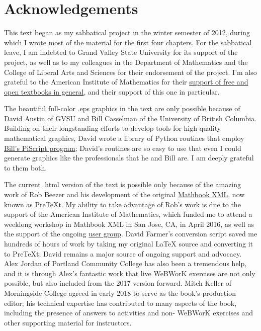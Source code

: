 \documentclass[10pt,]{book}
\theoremstyle{plain}
\theoremstyle{definition}
\theoremstyle{definition}
\theoremstyle{definition}
\theoremstyle{definition}
\numberwithin{equation}{section}
\let\oldchapter\chapter
\renewcommand\chapter{\clearpage\gdef\znewpage{\global\let\znewpage\clearpage}\oldchapter}
\begin{document}
\chapter*{Acknowledgements}\label{acknowledgement-1}
\hypertarget{p-1}{}%
This text began as my sabbatical project in the winter semester of 2012, during which I wrote most of the material for the first four chapters. For the sabbatical leave, I am indebted to Grand Valley State University for its support of the project, as well as to my colleagues in the Department of Mathematics and the College of Liberal Arts and Sciences for their endorsement of the project. I'm also grateful to the American Institute of Mathematics for their \href{https://aimath.org/textbooks/}{support of free and open textbooks in general}, and their support of this one in particular.%
\par
\hypertarget{p-2}{}%
The beautiful full-color .eps graphics in the text are only possible because of David Austin of GVSU and Bill Casselman of the University of British Columbia. Building on their longstanding efforts to develop tools for high quality mathematical graphics, David wrote a library of Python routines that employ \href{http://gvsu.edu/s/bi}{Bill's PiScript program}; David's routines are so easy to use that even I could generate graphics like the professionals that he and Bill are. I am deeply grateful to them both.%
\par
\hypertarget{p-3}{}%
The current .html version of the text is possible only because of the amazing work of Rob Beezer and his development of the original \href{https://mathbook.pugetsound.edu}{Mathbook XML}, now known as PreTeXt. My ability to take advantage of Rob's work is due to the support of the American Institute of Mathematics, which funded me to attend a weeklong workshop in Mathbook XML in San Jose, CA, in April 2016, as well as the support of the ongoing \href{https://groups.google.com/forum/\#!forum/pretext-support}{user group}. David Farmer's conversion script saved me hundreds of hours of work by taking my original \LaTeX{} source and converting it to PreTeXt; David remains a major source of ongoing support and advocacy. Alex Jordan of Portland Community College has also been a tremendous help, and it is through Alex's fantastic work that live WeBWorK exercises are not only possible, but also included from the 2017 version forward. Mitch Keller of Morningside College agreed in early 2018 to serve as the book's production editor; his technical expertise has contributed to many aspects of the book, including the presence of answers to activities and non- WeBWorK exercises and other supporting material for instructors.%
\end{document}
